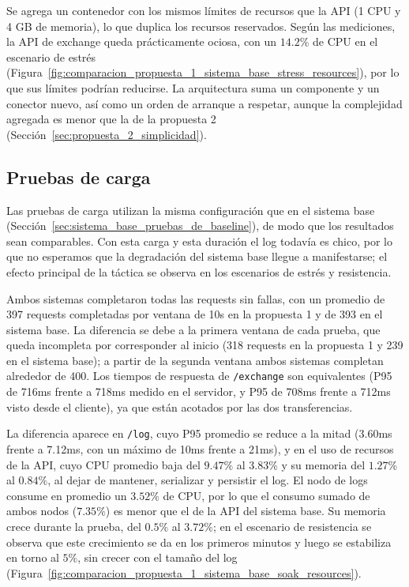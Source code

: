         Se agrega un contenedor con los mismos límites de recursos que la API (1 CPU y 4 GB de memoria), lo que duplica los
        recursos reservados. Según las mediciones, la API de exchange queda prácticamente ociosa, con un $14.2\%$ de CPU en el
        escenario de estrés (Figura~\ref{fig:comparacion_propuesta_1_sistema_base_stress_resources}), por lo que sus límites
        podrían reducirse. La arquitectura suma un componente y un conector nuevo, así como un orden de arranque a respetar,
        aunque la complejidad agregada es menor que la de la propuesta 2 (Sección~\ref{sec:propuesta_2_simplicidad}).

    \subsection{Pruebas de carga}
    \label{sec:propuesta_1_pruebas_de_baseline}

    Las pruebas de carga utilizan la misma configuración que en el sistema base (Sección~\ref{sec:sistema_base_pruebas_de_baseline}), de modo que los resultados sean comparables.
    Con esta carga y esta duración el log todavía es chico, por lo que no esperamos que la degradación del sistema base llegue a manifestarse; el efecto principal de la táctica se observa en los escenarios de estrés y resistencia.

    Ambos sistemas completaron todas las requests sin fallas, con un promedio de 397 requests completadas por ventana de 10s en la propuesta 1 y de 393 en el sistema base.
    La diferencia se debe a la primera ventana de cada prueba, que queda incompleta por corresponder al inicio (318 requests en la propuesta 1 y 239 en el sistema base); a partir de la segunda ventana ambos sistemas completan alrededor de 400.
    Los tiempos de respuesta de \texttt{/exchange} son equivalentes (P95 de 716ms frente a 718ms medido en el servidor, y P95 de 708ms frente a 712ms visto desde el cliente), ya que están acotados por las dos transferencias.

    La diferencia aparece en \texttt{/log}, cuyo P95 promedio se reduce a la mitad (3.60ms frente a 7.12ms, con un máximo de 10ms frente a 21ms), y en el uso de recursos de la API, cuyo CPU promedio baja del $9.47\%$ al $3.83\%$ y su memoria del $1.27\%$ al $0.84\%$, al dejar de mantener, serializar y persistir el log.
    El nodo de logs consume en promedio un $3.52\%$ de CPU, por lo que el consumo sumado de ambos nodos ($7.35\%$) es menor que el de la API del sistema base.
    Su memoria crece durante la prueba, del $0.5\%$ al $3.72\%$; en el escenario de resistencia se observa que este crecimiento se da en los primeros minutos y luego se estabiliza en torno al $5\%$, sin crecer con el tamaño del log (Figura~\ref{fig:comparacion_propuesta_1_sistema_base_soak_resources}).

